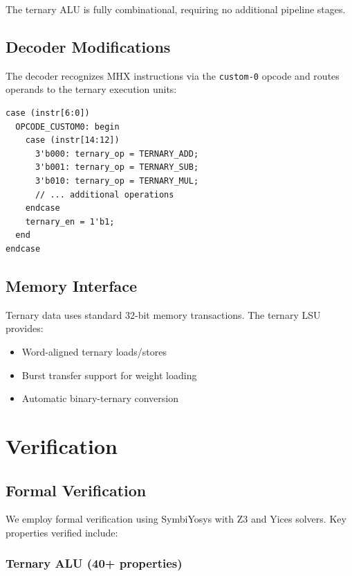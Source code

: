\documentclass[conference,10pt]{IEEEtran}
\newcommand{\mhx}{\textsc{MHX\texttrademark}}
\begin{document}
The ternary ALU is fully combinational, requiring no additional pipeline stages.

\subsection{Decoder Modifications}

The decoder recognizes \mhx{} instructions via the \texttt{custom-0} opcode and routes operands to the ternary execution units:

\begin{lstlisting}[caption={Decoder snippet for ternary operations}]
case (instr[6:0])
  OPCODE_CUSTOM0: begin
    case (instr[14:12])
      3'b000: ternary_op = TERNARY_ADD;
      3'b001: ternary_op = TERNARY_SUB;
      3'b010: ternary_op = TERNARY_MUL;
      // ... additional operations
    endcase
    ternary_en = 1'b1;
  end
endcase
\end{lstlisting}

\subsection{Memory Interface}

Ternary data uses standard 32-bit memory transactions. The ternary LSU provides:

\begin{itemize}
    \item Word-aligned ternary loads/stores
    \item Burst transfer support for weight loading
    \item Automatic binary-ternary conversion
\end{itemize}

\section{Verification}
\label{sec:verification}

\subsection{Formal Verification}

We employ formal verification using SymbiYosys with Z3 and Yices solvers. Key properties verified include:

\subsubsection{Ternary ALU (40+ properties)}
\end{document}
